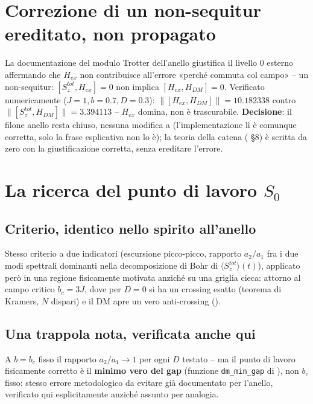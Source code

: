 \documentclass[11pt,a4paper]{article}
\begin{document}
\section{Correzione di un non-sequitur ereditato, non propagato}

La documentazione del modulo Trotter dell'anello giustifica il livello 0 esterno affermando che $H_{ex}$ non contribuisce all'errore «perché commuta col campo» -- un non-sequitur: $[S_z^{tot},H_{ex}]=0$ non implica $[H_{ex},H_{DM}]=0$. Verificato numericamente ($J{=}1,b{=}0.7,D{=}0.3$): $\|[H_{ex},H_{DM}]\|=10.182338$ contro $\|[S_z^{tot},H_{DM}]\|=3.394113$ -- $H_{ex}$ domina, non è trascurabile. \textbf{Decisione}: il filone anello resta chiuso, nessuna modifica a \texttt{} (l'implementazione lì è comunque corretta, solo la frase esplicativa non lo è); la teoria della catena (\texttt{} \S8) è scritta da zero con la giustificazione corretta, senza ereditare l'errore.

\section{La ricerca del punto di lavoro $S_0$}

\subsection{Criterio, identico nello spirito all'anello}

Stesso criterio a due indicatori (escursione picco-picco, rapporto $a_2/a_1$ fra i due modi spettrali dominanti nella decomposizione di Bohr di $\langle S_z^{tot}\rangle(t)$), applicato però in una regione fisicamente motivata anziché su una griglia cieca: attorno al campo critico $b_c=3J$, dove per $D=0$ si ha un crossing esatto (teorema di Kramers, $N$ dispari) e il DM apre un vero anti-crossing (\texttt{}).

\subsection{Una trappola nota, verificata anche qui}

A $b=b_c$ fisso il rapporto $a_2/a_1\to1$ per ogni $D$ testato -- ma il punto di lavoro fisicamente corretto è il \textbf{minimo vero del gap} (funzione \texttt{dm\_min\_gap} di \texttt{}), non $b_c$ fisso: stesso errore metodologico da evitare già documentato per l'anello, verificato qui esplicitamente anziché assunto per analogia.
\end{document}
